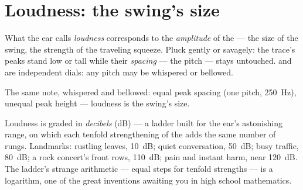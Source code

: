 \section{Loudness: the swing's size}

\begin{proposition}\label{prop:g8:sound-pitch-loudness:loudness}
What the ear calls \emph{loudness} corresponds to the
\emph{amplitude} of the  --- the
size of the swing, the strength of the traveling squeeze.
Pluck gently or savagely: the trace's peaks stand low or
tall while their \emph{spacing} --- the pitch --- stays
untouched.  and  are independent dials:
any pitch may be whispered or bellowed.
\end{proposition}

\begin{omfigure}

{\small The same note, whispered and bellowed: equal peak
spacing (one pitch, \qty{250}{Hz}), unequal peak height ---
loudness is the swing's size.}
\end{omfigure}

\begin{example}\label{ex:g8:sound-pitch-loudness:decibels}
Loudness is graded in \emph{decibels}
(\unit{dB}) --- a ladder built for the ear's astonishing
range, on which each tenfold strengthening of the  adds
the same number of rungs. Landmarks: rustling leaves,
\qty{10}{dB}; quiet conversation, \qty{50}{dB}; busy
traffic, \qty{80}{dB}; a rock concert's front rows,
\qty{110}{dB}; pain and instant harm, near \qty{120}{dB}.
The ladder's strange arithmetic --- equal steps for tenfold
strengths --- is a logarithm, one of the great inventions
awaiting you in high school mathematics.
\end{example}

